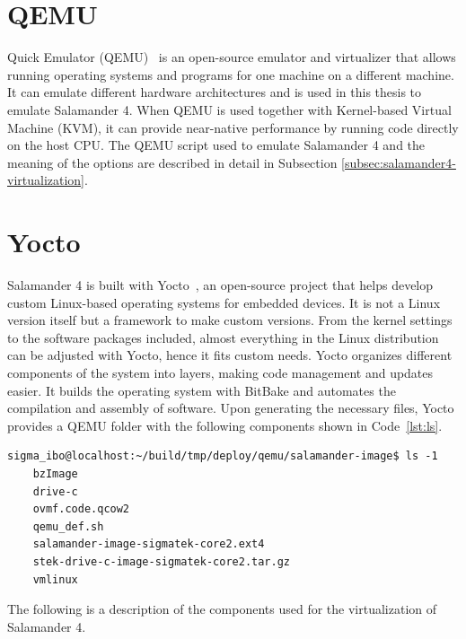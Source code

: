 \documentclass[MMR,Master,english]{style/twbook}
\begin{document}
\clearpage

\section{QEMU}\label{sec:qemu}

Quick Emulator (QEMU)~\cite{QEMU} is an open-source emulator and virtualizer that allows running operating systems and programs for one machine on a different machine. It can emulate different hardware architectures and is used in this thesis to emulate Salamander 4. When QEMU is used together with Kernel-based Virtual Machine (KVM), it can provide near-native performance by running code directly on the host CPU. The QEMU script used to emulate Salamander 4 and the meaning of the options are described in detail in Subsection \ref{subsec:salamander4-virtualization}.

\section{Yocto}\label{sec:yocto}

Salamander 4 is built with Yocto~\cite{WelcomeYoctoProject}, an open-source project that helps develop custom Linux-based operating systems for embedded devices. It is not a Linux version itself but a framework to make custom versions. From the kernel settings to the software packages included, almost everything in the Linux distribution can be adjusted with Yocto, hence it fits custom needs. Yocto organizes different components of the system into layers, making code management and updates easier. It builds the operating system with BitBake and automates the compilation and assembly of software. Upon generating the necessary files, Yocto provides a QEMU folder with the following components shown in Code~\ref{lst:ls}.

\vspace{2em}
\begin{lstlisting}[name={Contents of QEMU Folder for Salamander 4},label={lst:ls}]
    sigma_ibo@localhost:~/build/tmp/deploy/qemu/salamander-image$ ls -1
    bzImage
    drive-c
    ovmf.code.qcow2
    qemu_def.sh
    salamander-image-sigmatek-core2.ext4
    stek-drive-c-image-sigmatek-core2.tar.gz
    vmlinux
    \end{lstlisting}

\noindent The following is a description of the components used for the virtualization of Salamander 4.
\end{document}

